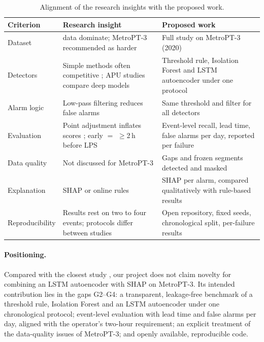 \begin{table}[H]
\centering
\caption{Alignment of the research insights with the proposed work.}
\label{tab:align}
\small
\begin{tabular}{>{\raggedright\arraybackslash}p{2.6cm}>{\raggedright\arraybackslash}p{5.6cm}>{\raggedright\arraybackslash}p{5.6cm}}
\toprule
Criterion & Research insight & Proposed work \\
\midrule
Dataset & 2022 data dominate; MetroPT-3 recommended as harder \cite{jakobs2025rules} & Full study on MetroPT-3 (2020) \\
Detectors & Simple methods often competitive \cite{schmidl2022anomaly}; APU studies compare deep models & Threshold rule, Isolation Forest and LSTM autoencoder under one protocol \\
Alarm logic & Low-pass filtering reduces false alarms \cite{ribeiro2016sequential,silva2023adversarial} & Same threshold and filter for all detectors \\
Evaluation & Point adjustment inflates scores \cite{kim2022rigorous}; early $=$ $\geq$2\,h before LPS \cite{silva2023adversarial} & Event-level recall, lead time, false alarms per day, reported per failure \\
Data quality & Not discussed for MetroPT-3 & Gaps and frozen segments detected and masked \\
Explanation & SHAP or online rules \cite{davari2024explaining,gama2024neurosymbolic} & SHAP per alarm, compared qualitatively with rule-based results \\
Reproducibility & Results rest on two to four events; protocols differ between studies & Open repository, fixed seeds, chronological split, per-failure results \\
\bottomrule
\end{tabular}
\end{table}

\paragraph{Positioning.}
Compared with the closest study \citep{davari2024explaining}, our project does not claim novelty for combining an LSTM autoencoder with SHAP on MetroPT-3. Its intended contribution lies in the gaps G2--G4: a transparent, leakage-free benchmark of a threshold rule, Isolation Forest and an LSTM autoencoder under one chronological protocol; event-level evaluation with lead time and false alarms per day, aligned with the operator's two-hour requirement; an explicit treatment of the data-quality issues of MetroPT-3; and openly available, reproducible code.

